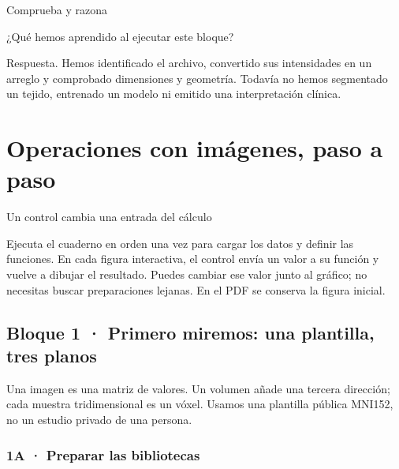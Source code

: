 
\begin{Practica}{Comprueba y razona}

¿Qué hemos aprendido al ejecutar este bloque?


Respuesta. Hemos identificado el archivo, convertido sus intensidades en un arreglo y comprobado dimensiones y geometría. Todavía no hemos segmentado un tejido, entrenado un modelo ni emitido una interpretación clínica.


\end{Practica}

\chapter[Ejemplos de código]{Operaciones con imágenes, paso a paso}

\label{cap:envivo}

\begin{Idea}{Un control cambia una entrada del cálculo}

Ejecuta el cuaderno en orden una vez para cargar los datos y definir las funciones. En cada figura interactiva, el control envía un valor a su función y vuelve a dibujar el resultado. Puedes cambiar ese valor junto al gráfico; no necesitas buscar preparaciones lejanas. En el PDF se conserva la figura inicial.

\end{Idea}

\clearpage

\section*{Bloque 1 · Primero miremos: una plantilla, tres planos}


\label{vivo:bloque1}

Una imagen es una matriz de valores. Un volumen añade una tercera dirección; cada muestra tridimensional es un vóxel. Usamos una plantilla pública MNI152, no un estudio privado de una persona.


\subsection*{1A · Preparar las bibliotecas}

\label{vivo:1a}

